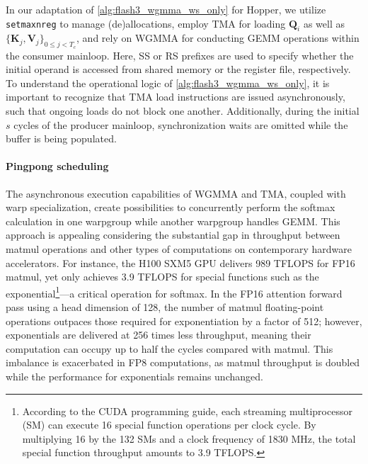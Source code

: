 \begin{enumerate}
In our adaptation of \cref{alg:flash3_wgmma_ws_only} for Hopper, we utilize \verb|setmaxnreg| to manage (de)allocations, employ TMA for loading $\mathbf{Q}_i$ as well as $\{ \mathbf{K}_j, \mathbf{V}_j \}_{0 \leq j < T_c}$, and rely on WGMMA for conducting GEMM operations within the consumer mainloop. Here, SS or RS prefixes are used to specify whether the initial operand is accessed from shared memory or the register file, respectively. To understand the operational logic of \cref{alg:flash3_wgmma_ws_only}, it is important to recognize that TMA load instructions are issued asynchronously, such that ongoing loads do not block one another. Additionally, during the initial $s$ cycles of the producer mainloop, synchronization waits are omitted while the buffer is being populated.

\paragraph{Pingpong scheduling} The asynchronous execution capabilities of WGMMA and TMA, coupled with warp specialization, create possibilities to concurrently perform the softmax calculation in one warpgroup while another warpgroup handles GEMM. This approach is appealing considering the substantial gap in throughput between matmul operations and other types of computations on contemporary hardware accelerators. For instance, the H100 SXM5 GPU delivers 989 TFLOPS for FP16 matmul, yet only achieves 3.9 TFLOPS for special functions such as the exponential\footnote{According to the CUDA programming guide, each streaming multiprocessor (SM) can execute 16 special function operations per clock cycle. By multiplying 16 by the 132 SMs and a clock frequency of 1830 MHz, the total special function throughput amounts to 3.9 TFLOPS.}—a critical operation for softmax. In the FP16 attention forward pass using a head dimension of 128, the number of matmul floating-point operations outpaces those required for exponentiation by a factor of 512; however, exponentials are delivered at 256 times less throughput, meaning their computation can occupy up to half the cycles compared with matmul. This imbalance is exacerbated in FP8 computations, as matmul throughput is doubled while the performance for exponentials remains unchanged.


\end{enumerate}
